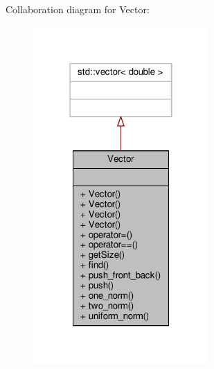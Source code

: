 Collaboration diagram for Vector\+:
\nopagebreak
\begin{figure}[H]
\begin{center}
\leavevmode
\includegraphics[width=190pt]{classVector__coll__graph}
\end{center}
\end{figure}

